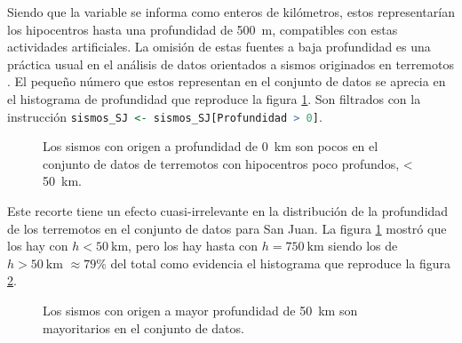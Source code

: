\documentclass[a4paper]{report}
\begin{document}
Siendo que la variable se informa como enteros de kilómetros, estos representarían los hipocentros hasta una profundidad de \SI{500}{\metre}, compatibles con estas actividades artificiales.
La omisión de estas fuentes a baja profundidad es una práctica usual en el análisis de datos orientados a sismos originados en terremotos \cite{hu_applying_2024}.
El pequeño número que estos representan  en el conjunto de datos se aprecia en el histograma de profundidad que reproduce la figura \ref{fig:histograma_profundidad50km}.
Son filtrados con la instrucción \lstinline[language=R,breaklines=true,basicstyle=\ttfamily]'sismos_SJ <- sismos_SJ[Profundidad > 0]'.
\begin{figure}[!ht]
	\centering
  \vspace{-1.5cm} %
	
  \vspace{-1cm} %
	\caption{Los sismos con origen a profundidad de \SI{0}{\kilo\metre} son pocos en el conjunto de datos de terremotos con hipocentros poco profundos, < \SI{50}{\kilo\metre}.}
	\label{fig:histograma_profundidad50km}
\end{figure}

Este recorte tiene un efecto cuasi-irrelevante en la distribución de la profundidad de los terremotos en el conjunto de datos para San Juan. 
La figura \ref{fig:histograma_profundidad50km} mostró que los hay con \(h < \SI{50}{\kilo\metre}\), pero los hay hasta con \(h= \SI{750}{\kilo\metre}\) siendo los de \(h > \SI{50}{\kilo\metre}\) \(\approx 79\%\) del total como evidencia el histograma que reproduce la figura \ref{fig:histograma_profundidad750km}.

\begin{figure}[!ht]
	\centering
  \vspace{-1.5cm} %
	
  \vspace{-1cm} %
	\caption{Los sismos con origen a mayor profundidad de \SI{50}{\kilo\metre} son mayoritarios en el conjunto de datos.}
	\label{fig:histograma_profundidad750km}
\end{figure}
\end{document}
